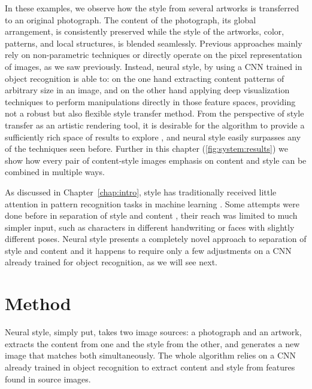 In these examples, we observe how the style from several artworks is transferred to an original photograph.
The content of the photograph, its global arrangement, is consistently preserved while the style of the artworks, color, patterns, and local structures, is blended seamlessly.
Previous approaches mainly rely on non-parametric techniques or directly operate on the pixel representation of images, as we saw previously.
Instead, neural style, by using a CNN trained in object recognition is able to: on the one hand extracting content patterns of arbitrary size in an image, and on the other hand applying deep visualization techniques to perform manipulations directly in those feature spaces, providing not a robust but also flexible style transfer method.
From the perspective of style transfer as an artistic rendering tool, it is desirable for the algorithm to provide a sufficiently rich space of results to explore \cite{Ashikhmin2003}, and neural style easily surpasses any of the techniques seen before.
Further in this chapter (\autoref{fig:system:results}) we show how every pair of content-style images emphasis on content and style can be combined in multiple ways.

As discussed in Chapter~\ref{chap:intro}, style has traditionally received little attention in pattern recognition tasks in machine learning \cite{Karayev2014}.
Some attempts were done before in separation of style and content \cite{Tenenbaum2000,Elgammal2004}, their reach was limited to much simpler input, such as characters in different handwriting or faces with slightly different poses.
Neural style presents a completely novel approach to separation of style and content and it happens to require only a few adjustments on a CNN already trained for object recognition, as we will see next.



\section{Method}
\label{sec:system:method}

Neural style, simply put, takes two image sources: a photograph and an artwork, extracts the content from one and the style from the other, and generates a new image that matches both simultaneously.
The whole algorithm relies on a CNN already trained in object recognition to extract content and style from features found in source images.

